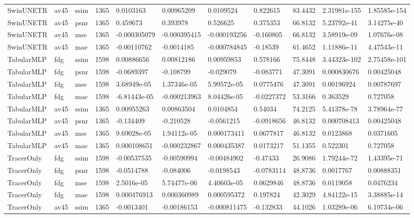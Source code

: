 \documentclass{article}
\begin{document}
\begin{landscape}
\begin{longtable}{lllllllllll}
SwinUNETR & av45 & ssim & 1365 & 0.0103163 & 0.00965209 & 0.0109524 & 0.822615 & 83.4432 & 2.31981e-155 & 1.85585e-154 \\
SwinUNETR & av45 & psnr & 1365 & 0.459673 & 0.393978 & 0.526625 & 0.375353 & 66.8132 & 5.23792e-41 & 3.14275e-40 \\
SwinUNETR & av45 & mse & 1365 & -0.000305079 & -0.000395415 & -0.000193256 & -0.160805 & 66.8132 & 3.58919e-09 & 1.07676e-08 \\
SwinUNETR & av45 & mae & 1365 & -0.00110762 & -0.0014185 & -0.000784845 & -0.18539 & 61.4652 & 1.11886e-11 & 4.47543e-11 \\
TabularMLP & fdg & ssim & 1598 & 0.00886656 & 0.00812186 & 0.00959853 & 0.578166 & 75.8448 & 3.44323e-102 & 2.75458e-101 \\
TabularMLP & fdg & psnr & 1598 & -0.0689397 & -0.108799 & -0.029079 & -0.083771 & 47.3091 & 0.000830676 & 0.00425048 \\
TabularMLP & fdg & mse & 1598 & 3.68949e-05 & 1.37346e-05 & 5.99572e-05 & 0.0775476 & 47.3091 & 0.00196924 & 0.00787697 \\
TabularMLP & fdg & mae & 1598 & -6.81443e-05 & -0.000213963 & 8.04426e-05 & -0.0227372 & 53.3166 & 0.363529 & 0.727058 \\
TabularMLP & av45 & ssim & 1365 & 0.00955263 & 0.00863504 & 0.0104854 & 0.54034 & 74.2125 & 5.41378e-78 & 3.78964e-77 \\
TabularMLP & av45 & psnr & 1365 & -0.134409 & -0.210528 & -0.0561215 & -0.0918656 & 46.8132 & 0.000708413 & 0.00425048 \\
TabularMLP & av45 & mse & 1365 & 9.69028e-05 & 1.94112e-05 & 0.000173411 & 0.0677817 & 46.8132 & 0.0123868 & 0.0371605 \\
TabularMLP & av45 & mae & 1365 & 0.000108651 & -0.000232867 & 0.000435387 & 0.0173217 & 51.1355 & 0.522301 & 0.727058 \\
TracerOnly & fdg & ssim & 1598 & -0.00537535 & -0.00590994 & -0.00484902 & -0.47433 & 26.9086 & 1.79244e-72 & 1.43395e-71 \\
TracerOnly & fdg & psnr & 1598 & -0.0514788 & -0.084006 & -0.0198543 & -0.0783114 & 48.8736 & 0.0017767 & 0.00888351 \\
TracerOnly & fdg & mse & 1598 & 2.5016e-05 & 5.74477e-06 & 4.40603e-05 & 0.0629846 & 48.8736 & 0.0119058 & 0.0476234 \\
TracerOnly & fdg & mae & 1598 & 0.000476913 & 0.000360989 & 0.000595372 & 0.197824 & 42.3029 & 4.84122e-15 & 3.38885e-14 \\
TracerOnly & av45 & ssim & 1365 & -0.0013401 & -0.00186153 & -0.000811475 & -0.132833 & 44.1026 & 1.03289e-06 & 6.19734e-06 \\

\end{longtable}
\end{landscape}
\end{document}
